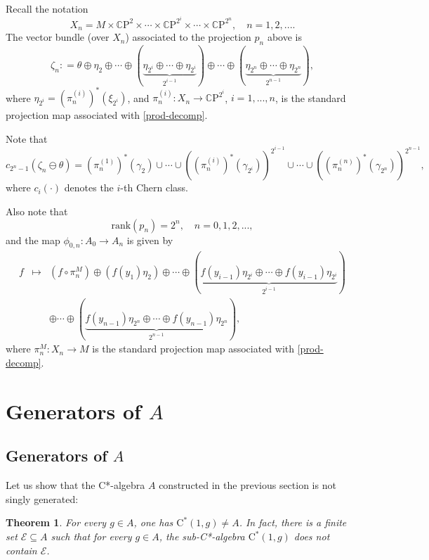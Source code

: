 \documentclass[12pt, oneside, psamsfonts]{amsart}
\newtheorem{thm}{Theorem}[section]
\theoremstyle{definition}
\theoremstyle{remark}
\numberwithin{equation}{section}
\begin{document}
Recall the notation 
\begin{equation}\label{prod-decomp}
X_{n} = M \times \mathbb C\mathrm{P}^{2} \times \cdots \times \mathbb C\mathrm{P}^{2^{i}} \times \cdots \times \mathbb C\mathrm{P}^{2^{n}},\quad n = 1, 2, ... . 
\end{equation}
The vector bundle (over $X_n$) associated to the projection $p_n$ above is
\begin{equation}\label{decomp-1-bundle}
 \zeta_n: = \theta \oplus \eta_{2} \oplus \cdots \oplus (\underbrace{\eta_{2^{i}}\oplus \cdots \oplus \eta_{2^{i}}}_{2^{i-1}}) \oplus \cdots \oplus (\underbrace{\eta_{2^{n}}\oplus \cdots \oplus \eta_{2^{n}}}_{2^{n-1}}),
 \end{equation}
where $\eta_{2^{i}} = (\pi_{n}^{(i)})^*(\xi_{2^{i}})$, and $\pi_{n}^{(i)}: X_{n} \to \mathbb C\mathrm{P}^{2^{i}}$, $i=1, ..., n$, is the standard projection map associated with  \eqref{prod-decomp}. 

Note that
\begin{equation}\label{chern-class-small}
c_{2^n - 1}(\zeta_n\ominus\theta) = (\pi_{n}^{(1)})^*(\gamma_2) \cup \cdots \cup ((\pi_{n}^{(i)})^*(\gamma_{2^{i}}))^{2^{i-1}} \cup \cdots \cup ((\pi_{n}^{(n)})^*(\gamma_{2^n}))^{2^{n-1}}, 
\end{equation}
where $c_i(\cdot)$ denotes the $i$-th Chern class.

Also note that 
$$ \mathrm{rank}(p_n) = 2^{n}, \quad n=0, 1,  2, ..., $$ 
and the map $\phi_{0, n}: A_0 \to A_n$ is given by
\begin{eqnarray}\label{decp-0-n}
 f & \mapsto & (f \circ\pi_{n}^M) \oplus (f(y_1)\eta_2) \oplus \cdots \oplus (\underbrace{f(y_{i-1})\eta_{2^{i}}\oplus \cdots \oplus f(y_{i-1})\eta_{2^{i}}}_{2^{i-1}}) \\ 
 & & \oplus \cdots  \oplus  (\underbrace{f(y_{n-1})\eta_{2^{n}}\oplus \cdots \oplus f(y_{n-1})\eta_{2^{n}}}_{2^{n-1}}), \nonumber
 \end{eqnarray}
where $\pi_n^M: X_n \to M$ is the standard projection map associated with  \eqref{prod-decomp}.





\section{Generators of $A$}

\subsection{Generators of $A$}
Let us show that the C*-algebra $A$ constructed in the previous section is not singly generated:
\begin{thm}\label{generator-thm}
For every $g \in A$, one has $\mathrm{C}^*(1, g) \neq A$. In fact, there is a finite set $\mathcal E \subseteq A$ such that for every $g \in A$, the sub-C*-algebra $\mathrm{C^*}(1, g)$ does not contain $\mathcal E$.
\end{thm}
\end{document}
